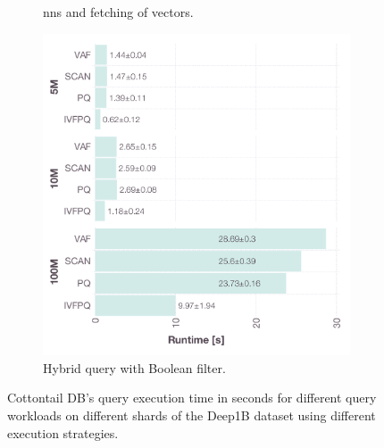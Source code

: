 \begin{figure}[p]
\begin{subfigure}[b]{0.49\textwidth}
        \caption{\acrshort{nns} and fetching of vectors.}
        \label{figure:cottontail_nns_fetch_runtime}
    \end{subfigure}
    \hfill
    \centering
    \begin{subfigure}[b]{0.49\textwidth}
        \centering
        \includegraphics[width=\textwidth]{figures/bignns/cottontail/bignns-cottontail-Hybrid-runtime}
        \caption{Hybrid query with Boolean filter.}
        \label{figure:cottontail_hybrid_runtime}
    \end{subfigure}
    \caption{Cottontail DB's query execution time in seconds for different query workloads on different shards of the Deep1B dataset using different execution strategies.}
    \label{figure:cottontail_runtime}
\end{figure}

